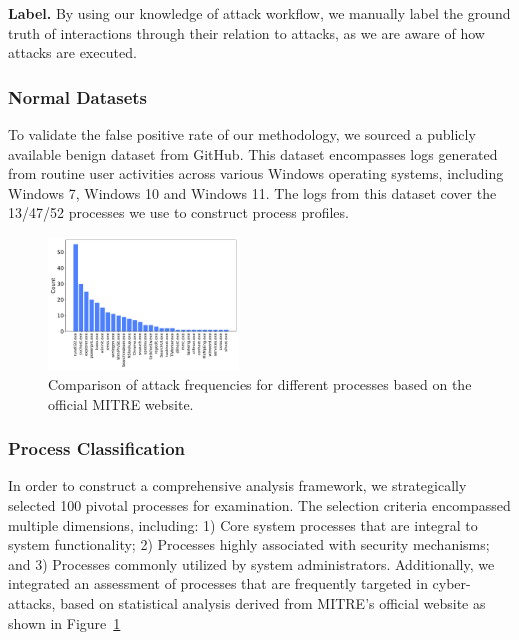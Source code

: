 \noindent
{\bf Label.}
By using our knowledge of attack workflow, we manually label the ground truth of interactions through their relation to attacks, as we are aware of how attacks are executed.


\subsubsection{Normal Datasets}
To validate the false positive rate of our methodology, we sourced a publicly available benign dataset from GitHub\cite{evtx-baseline2022}. This dataset encompasses logs generated from routine user activities across various Windows operating systems, including Windows 7, Windows 10 and Windows 11. The logs from this dataset cover the 13/47/52 processes we use to construct process profiles.

\begin{figure}[h]
    \centering
      \includegraphics[width=0.45\textwidth]{figs/process.pdf}
    \caption{Comparison of attack frequencies for different processes based on the official MITRE website.}
    \label{fig-process}
\end{figure}

\subsubsection{Process Classification}

In order to construct a comprehensive analysis framework, we strategically selected 100 pivotal processes for examination. The selection criteria encompassed multiple dimensions, including: 1) Core system processes that are integral to system functionality; 2) Processes highly associated with security mechanisms; and 3) Processes commonly utilized by system administrators. Additionally, we integrated an assessment of processes that are frequently targeted in cyber-attacks, based on statistical analysis derived from MITRE's official website as shown in Figure~\ref{fig-process}


\newcommand{\colorbar}[1]{%
    \begin{tikzpicture}
        \definecolor{mycolor}{RGB}{255,204,204}
        \fill[mycolor] (0,0) rectangle (#1/100*0.7, 0.5); %
        \draw[black] (0,0) rectangle (0.7,0.5);
    \end{tikzpicture}
}


